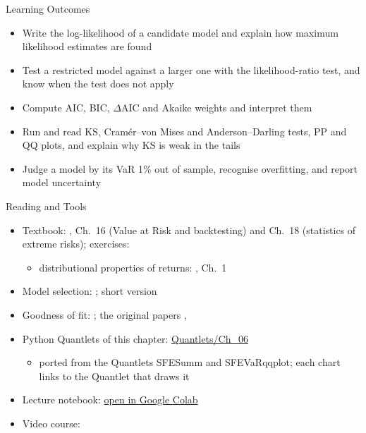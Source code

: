 \begin{frame}{Learning Outcomes}
\itemsize{\small}
\begin{itemize}
    \item Write the log-likelihood of a candidate model and explain how maximum likelihood estimates are found
    \item Test a restricted model against a larger one with the likelihood-ratio test, and know when the test does not apply
    \item Compute AIC, BIC, $\Delta$AIC and Akaike weights and interpret them
    \item Run and read KS, Cramér--von Mises and Anderson--Darling tests, PP and QQ plots, and explain why KS is weak in the tails
    \item Judge a model by its VaR 1\% out of sample, recognise overfitting, and report model uncertainty
\end{itemize}
\end{frame}

\begin{frame}{Reading and Tools}
\itemsize{\small}
\begin{itemize}
    \item Textbook: , Ch.~16 (Value at Risk and backtesting) and Ch.~18 (statistics of extreme risks); exercises: 
    \begin{itemize}
        \item distributional properties of returns: , Ch.~1
    \end{itemize}
    \item Model selection: ; short version 
    \item Goodness of fit: ; the original papers , 
    \item Python Quantlets of this chapter: \href{https://github.com/danpele/SFM/tree/main/Quantlets/Ch_06}{Quantlets/Ch\_06}
    \begin{itemize}
        \item ported from the Quantlets SFESumm and SFEVaRqqplot; each chart links to the Quantlet that draws it
    \end{itemize}
    \item Lecture notebook: \href{\colaburl{notebooks/EN/chapter6_lecture_notebook.ipynb}}{open in Google Colab}
    \item Video course: 
\end{itemize}
\end{frame}



